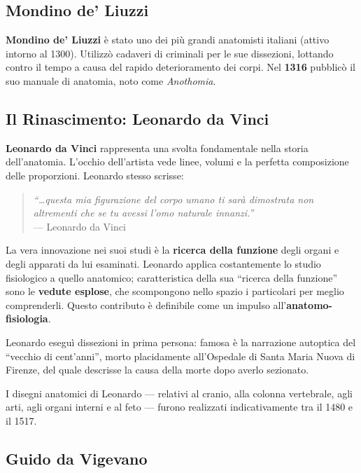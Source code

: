 \subsection{Mondino de' Liuzzi}

\textbf{Mondino de' Liuzzi} è stato uno dei più grandi anatomisti italiani (attivo intorno al 1300). Utilizzò cadaveri di criminali per le sue dissezioni, lottando contro il tempo a causa del rapido deterioramento dei corpi. Nel \textbf{1316} pubblicò il suo manuale di anatomia, noto come \textit{Anothomia}.

\subsection{Il Rinascimento: Leonardo da Vinci}

\textbf{Leonardo da Vinci} rappresenta una svolta fondamentale nella storia dell'anatomia. L'occhio dell'artista vede linee, volumi e la perfetta composizione delle proporzioni. Leonardo stesso scrisse:

\begin{quote}
\textit{``\ldots questa mia figurazione del corpo umano ti sarà dimostrata non altrementi che se tu avessi l'omo naturale innanzi.''}\\
\hfill --- Leonardo da Vinci
\end{quote}

La vera innovazione nei suoi studi è la \textbf{ricerca della funzione} degli organi e degli apparati da lui esaminati. Leonardo applica costantemente lo studio fisiologico a quello anatomico; caratteristica della sua ``ricerca della funzione'' sono le \textbf{vedute esplose}, che scompongono nello spazio i particolari per meglio comprenderli. Questo contributo è definibile come un impulso all'\textbf{anatomo-fisiologia}.

Leonardo eseguì dissezioni in prima persona: famosa è la narrazione autoptica del ``vecchio di cent'anni'', morto placidamente all'Ospedale di Santa Maria Nuova di Firenze, del quale descrisse la causa della morte dopo averlo sezionato.

\noindent I disegni anatomici di Leonardo --- relativi al cranio, alla colonna vertebrale, agli arti, agli organi interni e al feto --- furono realizzati indicativamente tra il 1480 e il 1517.

\subsection{Guido da Vigevano}

